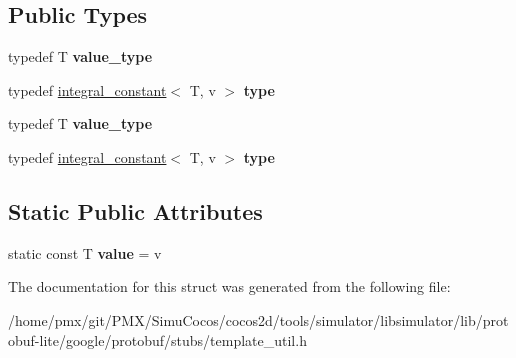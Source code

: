 \subsection*{Public Types}
\begin{DoxyCompactItemize}
\item 
\mbox{\label{structgoogle_1_1protobuf_1_1internal_1_1integral__constant_a3621b8a0beb4d04a3ebe8e2309b12051}} 
typedef T {\bfseries value\+\_\+type}
\item 
\mbox{\label{structgoogle_1_1protobuf_1_1internal_1_1integral__constant_ae5303f0a156ef126ca7edfaa8fa6e47a}} 
typedef \hyperlink{structgoogle_1_1protobuf_1_1internal_1_1integral__constant}{integral\+\_\+constant}$<$ T, v $>$ {\bfseries type}
\item 
\mbox{\label{structgoogle_1_1protobuf_1_1internal_1_1integral__constant_a3621b8a0beb4d04a3ebe8e2309b12051}} 
typedef T {\bfseries value\+\_\+type}
\item 
\mbox{\label{structgoogle_1_1protobuf_1_1internal_1_1integral__constant_ae5303f0a156ef126ca7edfaa8fa6e47a}} 
typedef \hyperlink{structgoogle_1_1protobuf_1_1internal_1_1integral__constant}{integral\+\_\+constant}$<$ T, v $>$ {\bfseries type}
\end{DoxyCompactItemize}
\subsection*{Static Public Attributes}
\begin{DoxyCompactItemize}
\item 
\mbox{\label{structgoogle_1_1protobuf_1_1internal_1_1integral__constant_ae61ecee2463272391dd9aa662ad03d9f}} 
static const T {\bfseries value} = v
\end{DoxyCompactItemize}


The documentation for this struct was generated from the following file\+:\begin{DoxyCompactItemize}
\item 
/home/pmx/git/\+P\+M\+X/\+Simu\+Cocos/cocos2d/tools/simulator/libsimulator/lib/protobuf-\/lite/google/protobuf/stubs/template\+\_\+util.\+h\end{DoxyCompactItemize}
